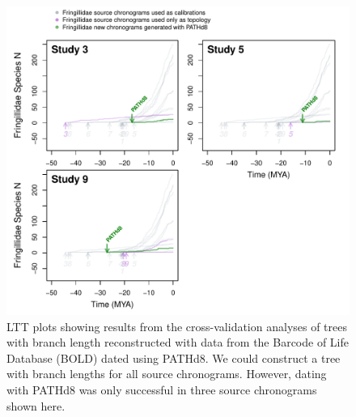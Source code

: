 \begin{figure}[!h]
\includegraphics{../figures/fig_crossval_boldsumm.pdf}
\caption{LTT plots showing results from the cross-validation analyses of trees with branch length reconstructed with data from the Barcode of Life Database (BOLD) dated using PATHd8. We could construct a tree with branch lengths for all source chronograms. However, dating with PATHd8 was only successful in three source chronograms shown here.}
\label{fig:cvbold}
\end{figure}
